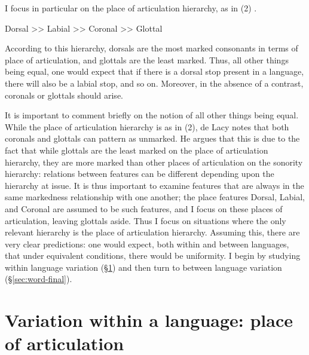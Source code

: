 \documentclass[output=paper]{langsci/langscibook}
\begin{document}
I focus in particular on the place of articulation hierarchy, as in (2) \citep[e.g.,][]{DeLacy2006}. 

\ea%
    \label{ex:2}
	  Dorsal {\textgreater}{\textgreater} Labial {\textgreater}{\textgreater} Coronal {\textgreater}{\textgreater} Glottal
    \z


According to this hierarchy, dorsals are the most marked consonants in terms of place of articulation, and glottals are the least marked. Thus, all other things being equal, one would expect that if there is a dorsal stop present in a language, there will also be a labial stop, and so on. Moreover, in the absence of a contrast, coronals or glottals should arise.

It is important to comment briefly on the notion of all other things being equal. While the place of articulation hierarchy is as in (2), de Lacy notes that both coronals and glottals can pattern as unmarked. He argues that this is due to the fact that while glottals are the least marked on the place of articulation hierarchy, they are more marked than other places of articulation on the sonority hierarchy: relations between features can be different depending upon the hierarchy at issue. It is thus important to examine features that are always in the same markedness relationship with one another; the place features Dorsal, Labial, and Coronal are assumed to be such features, and I focus on these places of articulation, leaving glottals aside. Thus I focus on situations where the only relevant hierarchy is the place of articulation hierarchy. Assuming this, there are very clear predictions: one would expect, both within and between languages, that under equivalent conditions, there would be uniformity. I begin by studying within language variation (\S \ref{sec:variation}) and then turn to between language variation (\S \ref{sec:word-final}).

\section{Variation within a language: place of articulation} \label{sec:variation}
\end{document}

